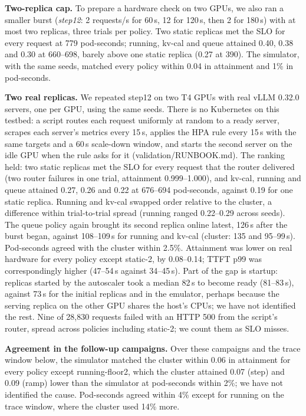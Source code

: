 \documentclass[10pt,conference]{IEEEtran}
\begin{document}
\textbf{Two-replica cap.} To prepare a hardware check on two GPUs, we also ran
a smaller burst (\emph{step12}: 2 requests/s for 60\,s, 12 for 120\,s, then 2
for 180\,s) with at most two replicas, three trials per policy. Two static
replicas met the SLO for every request at 779 pod-seconds; running, kv-cal
and queue attained 0.40, 0.38 and 0.30 at 660--698, barely above one static
replica (0.27 at 390). The simulator, with the same seeds, matched every policy
within 0.04 in attainment and 1\% in pod-seconds.

\textbf{Two real replicas.}
We repeated step12 on two T4 GPUs with real vLLM 0.32.0 servers, one per GPU,
using the same seeds. There is no Kubernetes on this testbed: a script routes
each request uniformly at random to a ready server, scrapes each server's
metrics every 15\,s, applies the HPA rule every 15\,s with the same targets
and a 60\,s scale-down window, and starts the second server on the idle GPU
when the rule asks for it (validation/RUNBOOK.md). The ranking held: two static
replicas met the SLO for every request that the router delivered (two
router failures in one trial, attainment 0.999--1.000), and kv-cal, running and queue attained 0.27, 0.26 and 0.22 at
676--694 pod-seconds, against 0.19 for one static replica. Running and kv-cal
swapped order relative to the cluster, a difference within trial-to-trial
spread (running ranged 0.22--0.29 across seeds). The queue policy again
brought its second replica online latest, 126\,s after the burst began,
against 108--109\,s for running and kv-cal (cluster: 135 and 95--99\,s).
Pod-seconds agreed with the cluster within 2.5\%. Attainment was lower on real
hardware for every policy except static-2, by 0.08--0.14; TTFT p99 was
correspondingly higher (47--54\,s against 34--45\,s). Part of the gap is
startup: replicas started by the autoscaler took a median 82\,s to become
ready (81--83\,s), against 73\,s for the initial replicas and in the
emulator, perhaps because the serving replica on the other GPU shares the
host's CPUs; we have not identified the rest. Nine of 28{,}830 requests failed
with an HTTP 500 from the script's router, spread across policies including
static-2; we count them as SLO misses.

\textbf{Agreement in the follow-up campaigns.} Over these campaigns and the
trace window below, the simulator matched the cluster within 0.06 in
attainment for every policy except running-floor2, which the cluster
attained 0.07 (step) and 0.09 (ramp) lower than the simulator at pod-seconds
within 2\%; we have not identified the cause. Pod-seconds agreed within 4\%
except for running on the trace window, where the cluster used 14\% more.
\end{document}
